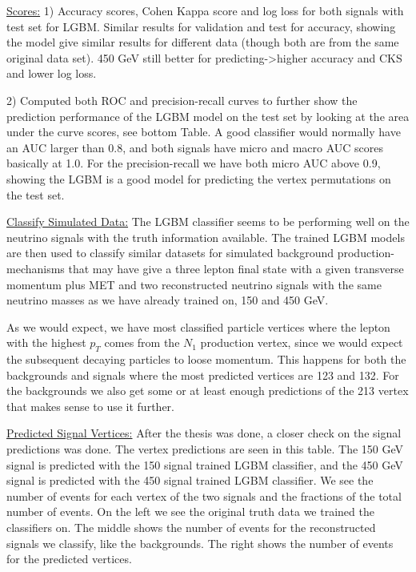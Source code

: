 \documentclass[a4paper, american, 12pt]{report}
\begin{document}
	
	\underline{Scores:}
	1) Accuracy scores, Cohen Kappa score and log loss for both signals with test set for LGBM. Similar results for validation and test for accuracy, showing the model give similar results for different data (though both are from the same original data set). 450 GeV still better for predicting->higher accuracy and CKS and lower log loss.
	
	2) Computed both ROC and precision-recall curves to further show the prediction performance of the LGBM model on the test set by looking at the area under the curve scores, see bottom Table. A good classifier would normally have an AUC larger than 0.8, and both signals have micro and macro AUC scores basically at 1.0. For the precision-recall we have both micro AUC above 0.9, showing the LGBM is a good model for predicting the vertex permutations on the test set.
	
	
	\underline{Classify Simulated Data:}
	The LGBM classifier seems to be performing well on the neutrino signals with the truth information available. The trained LGBM models are then used to classify similar datasets for simulated background production-mechanisms that may have give a three lepton  final state with a given transverse momentum plus MET and two reconstructed neutrino signals with the same neutrino masses as we have already trained on, 150 and 450 GeV.
	
	As we would expect, we have most classified particle vertices where the lepton with the highest $p_T$ comes from the $N_1$ production vertex, since we would expect the subsequent decaying particles to loose momentum. This happens for both the backgrounds and signals where the most predicted vertices are 123 and 132. For the backgrounds we also get some or at least enough predictions of the 213 vertex that makes sense to use it further.
	
	
	\underline{Predicted Signal Vertices:}
	After the thesis was done, a closer check on the signal predictions was done. The vertex predictions are seen in this table. The 150 GeV signal is predicted with the 150 signal trained LGBM classifier, and the 450 GeV signal is predicted with the 450 signal trained LGBM classifier. We see the number of events for each vertex of the two signals and the fractions of the total number of events. On the left we see the original truth data we trained the classifiers on. The middle shows the number of events for the reconstructed signals we classify, like the backgrounds. The right shows the number of events for the predicted vertices.
	
\end{document}
